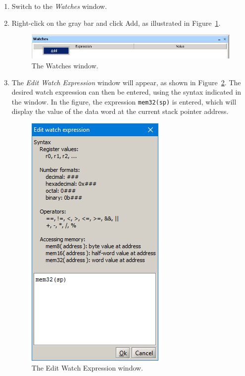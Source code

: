 \documentclass[11pt, twoside, pdftex]{article}
\begin{document}
\begin{enumerate}
\item Switch to the {\it Watches} window.

\item Right-click on the gray bar and click \textsf{Add},
as illustrated in Figure~\ref{fig:42}.

\begin{figure}[H]
   \begin{center}
      \includegraphics[scale=.9]{screenshots/figure42.png}
   \end{center}
   \caption{The Watches window.}
	 \label{fig:42}
\end{figure}

\item The {\it Edit Watch Expression} window will appear, as
shown in Figure~\ref{fig:43}. The desired watch expression can then be
entered, using the syntax indicated in the window. In the figure,
the expression \texttt{mem32(sp)} is entered, which will display
the value of the data word at the current stack pointer address.

\begin{figure}[H]
   \begin{center}
      \includegraphics[scale=.8]{screenshots/figure43.png}
   \end{center}
   \caption{The Edit Watch Expression window.}
	 \label{fig:43}
\end{figure}


\end{enumerate}
\end{document}
